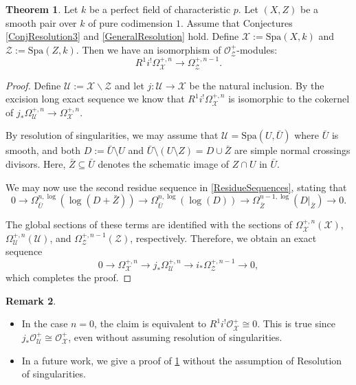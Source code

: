 \documentclass{amsart}
\def\Spa{\textrm{Spa}}
\theoremstyle{definition}
\newtheorem{theorem}{Theorem}[section]
\newtheorem{remark}[theorem]{Remark}
\numberwithin{equation}{section}
\begin{document}
\begin{theorem}\label{ValueOfRi!OmegaCodim1}
	Let $k$ be a perfect field of characteristic $p$. Let $(X,Z)$ be a smooth pair over $k$ of pure codimension $1$.
	 Assume that Conjectures \ref{ConjResolution3} and \ref{GeneralResolution} hold.
	  Define $\mathcal{X}:=\Spa(X,k)$ and $\mathcal{Z}:=\Spa(Z,k)$. Then we have an isomorphism of $\mathcal{O}^+_\mathcal{Z}$-modules:
	\[
	R^1i^!\Omega_{\mathcal{X}}^{+,n}\to \Omega_{\mathcal{Z}}^{+,n-1} .
	\]
\end{theorem}
\begin{proof}
	Define $\mathcal{U}:=\mathcal{X}\backslash \mathcal{Z}$ and let $j:\mathcal{U}\to \mathcal{X}$ be the natural inclusion. By the excision long exact sequence we know that $R^1i^!\Omega_{\mathcal{X}}^{+,n}$ is isomorphic to the cokernel of $j_*\Omega_{\mathcal{U}}^{+,n}\to  \Omega_{\mathcal{X}}^{+,n}$. 
	
	By resolution of singularities, we may assume that \( \mathcal{U} = \Spa(U, \bar{U}) \) where \( \bar{U} \) is smooth, and both \( D := \bar{U} \setminus U \) and \( \bar{U} \setminus (U \setminus Z) = D \cup \bar{Z} \) are simple normal crossings divisors. Here, \( \bar{Z} \subseteq \bar{U} \) denotes the schematic image of \( Z \cap U \) in $\bar{U}$.
	
	 We may now use the second residue sequence in \cref{ResidueSequences}, stating that 
	\[
	0\to \Omega^{n,\log}_{\bar{U}}(\log (D+\bar{Z}))\to \Omega^{n,\log}_{\bar{U}}(\log (D))\to \Omega^{n-1,\log}_{\bar{Z}}(D|_{\bar{Z}})\to 0.
	\]
	
	The global sections of these terms are identified with the sections of \( \Omega^{+,n}_{\mathcal{X}}(\mathcal{X}) \), \( \Omega^{+,n}_{\mathcal{U}}(\mathcal{U}) \), and \( \Omega^{+,n-1}_{\mathcal{Z}}(\mathcal{Z}) \), respectively. Therefore, we obtain an exact sequence
	\begin{equation}\label{SESOmega+1}
		0 \to \Omega^{+,n}_{\mathcal{X}} \to j_* \Omega^{+,n}_{\mathcal{U}} \to i_* \Omega^{+,n-1}_{\mathcal{Z}} \to 0,
	\end{equation}
	which completes the proof.
\end{proof}
\begin{remark}
	\begin{itemize}
		 \item 	In the case $n=0$, the claim is equivalent to $R^1i^! \mathcal{O}^+_{\mathcal{X}}\cong 0$. This is true since $j_*\mathcal{O}^+_{\mathcal{U}}\cong \mathcal{O}^+_{\mathcal{X}}$, even without assuming resolution of singularities.
		 \item  In a future work, we give a proof of \cref{ValueOfRi!OmegaCodim1} without the assumption of Resolution of singularities.
	\end{itemize}

\end{remark}
\end{document}
